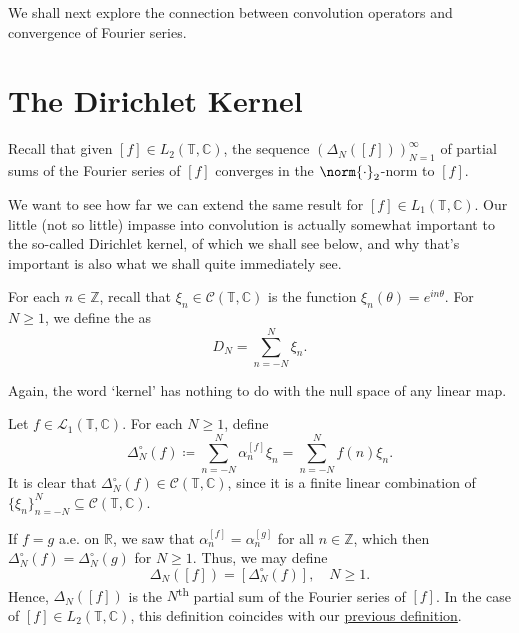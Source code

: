 \documentclass[notoc,notitlepage]{tufte-book}
\begin{document}
We shall next explore the connection between convolution operators
and convergence of Fourier series.


\section{The Dirichlet Kernel}%
\label{sec:the_dirichlet_kernel}

Recall that given $[f] \in L_2(\mathbb{T}, \mathbb{C})$, the sequence
$(\Delta_N([f]))_{N=1}^{\infty}$ of partial sums of the Fourier series
of $[f]$ converges in the $\norm{\cdot}_2$-norm to $[f]$.

We want to see how far we can extend the same result for
$[f] \in L_1(\mathbb{T}, \mathbb{C})$.
Our little (not so little) impasse into convolution is actually somewhat important
to the so-called Dirichlet kernel, of which we shall see below,
and why that's important is also what we shall quite immediately see.

\begin{defn}\label{defn:dirichlet_kernel_of_order_n_}
  For each $n \in \mathbb{Z}$,
  recall that $\xi_n \in \mathcal{C}(\mathbb{T}, \mathbb{C})$
  is the function $\xi_n(\theta) = e^{in \theta}$.
  For $N \geq 1$, we define the  as
  \begin{equation*}
    D_N = \sum_{n = -N}^{N} \xi_n.
  \end{equation*}
\end{defn}

\begin{note}
  Again, the word `kernel' has nothing to do
  with the null space of any linear map.
\end{note}

Let $f \in \mathcal{L}_1(\mathbb{T}, \mathbb{C})$.
For each $N \geq 1$, define
\begin{equation*}
  \Delta_N^\circ(f) \coloneqq \sum_{n = -N}^{N} \alpha_n^{[f]} \xi_n
  = \sum_{n = -N}^{N} \hat{f}(n) \xi_n.
\end{equation*}
It is clear that $\Delta_N^\circ(f) \in \mathcal{C}(\mathbb{T}, \mathbb{C})$,
since it is a finite linear combination of $\{ \xi_n \}_{n = -N}^{N} \subseteq
\mathcal{C}(\mathbb{T}, \mathbb{C})$.

If $f = g$ a.e. on $\mathbb{R}$,
we saw that $\alpha_n^{[f]} = \alpha_n^{[g]}$ for all $n \in \mathbb{Z}$,
which then $\Delta_N^\circ(f) = \Delta_N^\circ(g)$ for $N \geq 1$.
Thus, we may define
\begin{equation*}
  \Delta_N([f]) = [\Delta_N^\circ(f)], \quad N \geq 1.
\end{equation*}
Hence, $\Delta_N([f])$ is the $N$\textsuperscript{th}
partial sum of the Fourier series of $[f]$.
In the case of $[f] \in L_2(\mathbb{T}, \mathbb{C})$,
this definition coincides with our
\hyperref[eg:fourier_for_bigl2_in_complex_unit_circle]{previous definition}.
\end{document}
